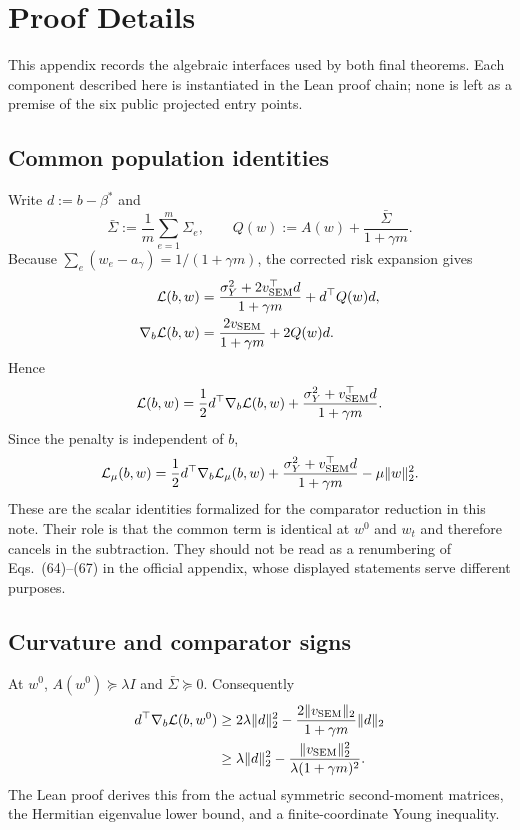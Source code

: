 \section{Proof Details}
\label{app:proofs}

This appendix records the algebraic interfaces used by both final theorems.
Each component described here is instantiated in the Lean proof chain; none is
left as a premise of the six public projected entry points.

\subsection{Common population identities}

Write $d:=b-\beta^*$ and
\[
  \bar\Sigma:=\frac1m\sum_{e=1}^m\Sigma_e,
  \qquad
  Q(w):=A(w)+\frac{\bar\Sigma}{1+\gamma m}.
\]
Because
$\sum_e(w_e-a_\gamma)=1/(1+\gamma m)$, the corrected risk expansion gives
\begin{align}
  \mathcal L(b,w)
  &=\frac{\sigma_Y^2+2v_{\rm SEM}^\top d}{1+\gamma m}
    +d^\top Q(w)d,
  \label{eq:appendix-L-expansion}\\
  \nabla_b\mathcal L(b,w)
  &=\frac{2v_{\rm SEM}}{1+\gamma m}+2Q(w)d.
  \label{eq:appendix-L-gradient}
\end{align}
Hence
\begin{equation}
  \mathcal L(b,w)
  =\frac12d^\top\nabla_b\mathcal L(b,w)
   +\frac{\sigma_Y^2+v_{\rm SEM}^\top d}{1+\gamma m}.
  \label{eq:appendix-loss-gradient-identity}
\end{equation}
Since the penalty is independent of $b$,
\begin{equation}
  \mathcal L_\mu(b,w)
  =\frac12d^\top\nabla_b\mathcal L_\mu(b,w)
   +\frac{\sigma_Y^2+v_{\rm SEM}^\top d}{1+\gamma m}
   -\mu\|w\|_2^2.
  \label{eq:appendix-penalized-identity}
\end{equation}
These are the scalar identities formalized for the comparator reduction in
this note.  Their role is that the common term is identical at $w^0$ and
$w_t$ and therefore cancels in the subtraction.  They should not be read as
a renumbering of Eqs.~(64)--(67) in the official appendix, whose displayed
statements serve different purposes.

\subsection{Curvature and comparator signs}

At $w^0$, $A(w^0)\succeq\lambda I$ and
$\bar\Sigma\succeq0$.  Consequently
\begin{align*}
  d^\top\nabla_b\mathcal L(b,w^0)
  &\ge2\lambda\|d\|_2^2
      -\frac{2\|v_{\rm SEM}\|_2}{1+\gamma m}\|d\|_2\\
  &\ge\lambda\|d\|_2^2
      -\frac{\|v_{\rm SEM}\|_2^2}
             {\lambda(1+\gamma m)^2}.
\end{align*}
The Lean proof derives this from the actual symmetric second-moment matrices,
the Hermitian eigenvalue lower bound, and a finite-coordinate Young
inequality.

